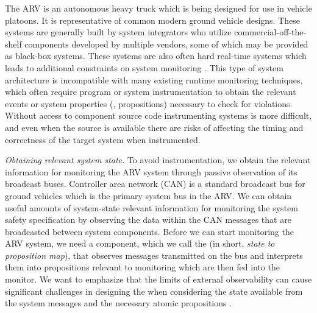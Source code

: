 The ARV is an autonomous heavy truck which is being designed for use in vehicle platoons. It is representative of common modern ground vehicle designs.
These systems are generally built by system integrators who utilize commercial-off-the-shelf components developed by multiple vendors, some of which may be provided as black-box systems.
These systems are also often hard real-time systems which leads to additional constraints on system monitoring \cite{Goodloe2010}.
This type of system architecture is incompatible with many existing runtime monitoring techniques, which often require program or system instrumentation \cite{Havelund2004, Chen2003, Bonakdarpour2012,Kim2004} to obtain the relevant events or system properties (\eg, propositions) necessary to check for violations.
Without access to component source code instrumenting systems is more difficult, and even when the source is available there are risks of affecting the timing and correctness of the target system when instrumented.

\noindent
\textit{Obtaining relevant system state.}
To avoid instrumentation, we obtain the relevant information for monitoring the ARV system through passive observation of
its broadcast buses. %
Controller area network (CAN) is a
standard broadcast bus for ground vehicles which is the primary system bus in the ARV. We can obtain useful amounts of system-state relevant information for monitoring
the system safety specification by observing the data within the CAN messages that are broadcasted between system components.
Before we can start monitoring the ARV system, we need a component, which we call the \sfmap (in short, \emph{state to proposition map}), that observes messages transmitted on the bus and interprets
them into propositions relevant to monitoring which are then fed into the monitor.
We want to emphasize that the limits of external observability can cause significant challenges
in designing the \sfmap when considering the state available from the system messages and
the necessary atomic propositions \cite{Kane2014}.

